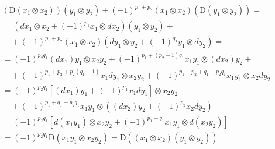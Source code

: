 \[
\begin{array}{l} \left(\mathrm{D} (x _ {1} \otimes x _ {2})\right) (y _ {1} \otimes y _ {2}) + (- 1) ^ {p _ {1} + p _ {2}} (x _ {1} \otimes x _ {2}) (\mathrm{D} (y _ {1} \otimes y _ {2})) = \\ = (d x _ {1} \otimes x _ {2} + (- 1) ^ {p _ {1}} x _ {1} \otimes d x _ {2}) (y _ {1} \otimes y _ {2}) + \\ \quad + (- 1) ^ {p _ {1} + p _ {2}} (x _ {1} \otimes x _ {2}) (d y _ {1} \otimes y _ {2} + (- 1) ^ {q _ {1}} y _ {1} \otimes d y _ {2}) = \\ = (- 1) ^ {p _ {2} q _ {1}} (d x _ {1}) y _ {1} \otimes x _ {2} y _ {2} + (- 1) ^ {p _ {1} + (p _ {2} - 1) q _ {1}} x _ {1} y _ {1} \otimes (d x _ {2}) y _ {2} + \\ \quad + (- 1) ^ {p _ {1} + p _ {2} + p _ {2} (q _ {1} - 1)} x _ {1} d y _ {1} \otimes x _ {2} y _ {2} + (- 1) ^ {p _ {1} + p _ {2} + q _ {1} + p _ {2} q _ {1}} x _ {1} y _ {1} \otimes x _ {2} d y _ {2} \\ = (- 1) ^ {p _ {2} q _ {1}} [ (d x _ {1}) y _ {1} + (- 1) ^ {p _ {1}} x _ {1} d y _ {1} ] \otimes x _ {2} y _ {2} + \\ \quad + (- 1) ^ {p _ {1} + q _ {1} + p _ {2} q _ {1}} x _ {1} y _ {1} \otimes ((d x _ {2}) y _ {2} + (- 1) ^ {p _ {2}} x _ {2} d y _ {2}) \\ = (- 1) ^ {p _ {2} q _ {1}} [ d (x _ {1} y _ {1}) \otimes x _ {2} y _ {2} + (- 1) ^ {p _ {1} + q _ {1}} x _ {1} y _ {1} \otimes d (x _ {2} y _ {2}) ] \\ = (- 1) ^ {p _ {2} q _ {1}} \mathrm{D} (x _ {1} y _ {1} \otimes x _ {2} y _ {2}) = \mathrm{D} ((x _ {1} \otimes x _ {2}) (y _ {1} \otimes y _ {2}))  . \end{array}
\]

